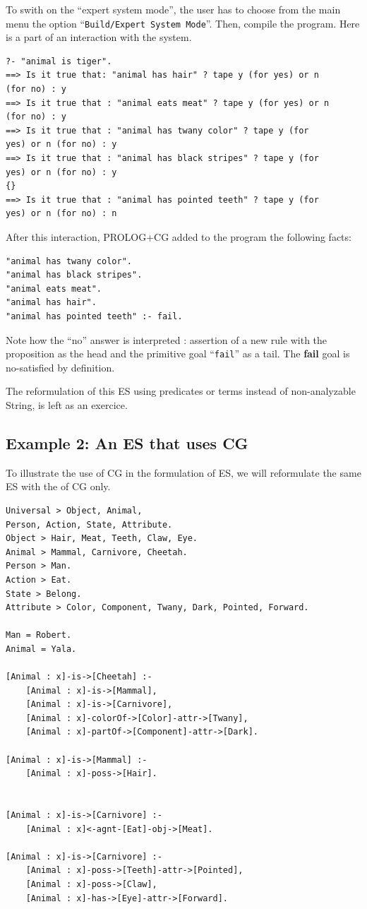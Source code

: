 \documentclass{book}
\begin{document}
To swith on the ``expert system mode'', the user has to choose from
the main menu the option ``\texttt{Build/Expert System Mode}''. Then,
compile the program. Here is a part of an interaction with the system.


\begin{verbatim}
?- "animal is tiger".
==> Is it true that: "animal has hair" ? tape y (for yes) or n
(for no) : y
==> Is it true that : "animal eats meat" ? tape y (for yes) or n
(for no) : y
==> Is it true that : "animal has twany color" ? tape y (for
yes) or n (for no) : y
==> Is it true that : "animal has black stripes" ? tape y (for
yes) or n (for no) : y
{}
==> Is it true that : "animal has pointed teeth" ? tape y (for
yes) or n (for no) : n
\end{verbatim}


After this interaction, PROLOG+CG added to
the program the following facts:


\begin{verbatim}
"animal has twany color".
"animal has black stripes".
"animal eats meat".
"animal has hair".
"animal has pointed teeth" :- fail.
\end{verbatim}

Note how the ``no'' answer is interpreted : assertion of a new rule
with the proposition as the head and the primitive goal
``\texttt{fail}'' as a tail. The {\bf fail} goal is no-satisfied by
definition.

The reformulation of this ES using predicates or terms instead of
non-analyzable String, is left as an exercice.

\subsection{Example 2: An ES that uses CG}

To illustrate the use of CG in the formulation of ES, we will
reformulate the same ES with the of CG only.


\begin{verbatim}
Universal > Object, Animal,
Person, Action, State, Attribute.
Object > Hair, Meat, Teeth, Claw, Eye.
Animal > Mammal, Carnivore, Cheetah.
Person > Man.
Action > Eat.
State > Belong.
Attribute > Color, Component, Twany, Dark, Pointed, Forward.

Man = Robert.
Animal = Yala.

[Animal : x]-is->[Cheetah] :-
    [Animal : x]-is->[Mammal],
    [Animal : x]-is->[Carnivore],
    [Animal : x]-colorOf->[Color]-attr->[Twany],
    [Animal : x]-partOf->[Component]-attr->[Dark].

[Animal : x]-is->[Mammal] :-
    [Animal : x]-poss->[Hair].


[Animal : x]-is->[Carnivore] :-
    [Animal : x]<-agnt-[Eat]-obj->[Meat].

[Animal : x]-is->[Carnivore] :-
    [Animal : x]-poss->[Teeth]-attr->[Pointed],
    [Animal : x]-poss->[Claw],
    [Animal : x]-has->[Eye]-attr->[Forward].
\end{verbatim}
\end{document}
